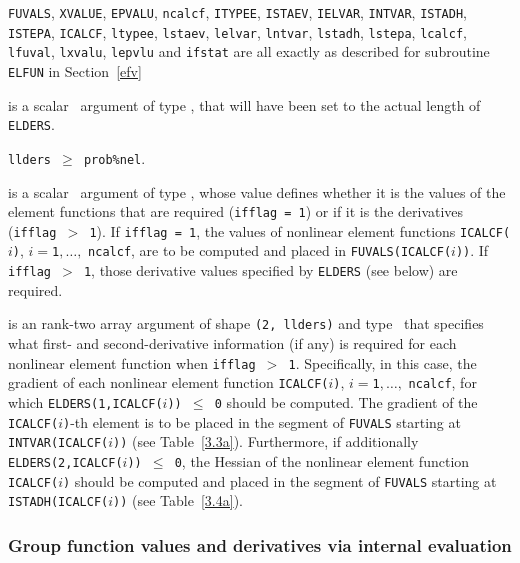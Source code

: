\documentclass{galahad}
\begin{document}
\begin{description}

{\tt FUVALS}, {\tt XVALUE}, {\tt EPVALU}, {\tt ncalcf}, {\tt ITYPEE},
{\tt ISTAEV}, {\tt IELVAR},
{\tt INTVAR}, {\tt ISTADH}, {\tt ISTEPA}, {\tt ICALCF}, {\tt ltypee},
{\tt lstaev}, {\tt lelvar},
{\tt lntvar}, {\tt lstadh}, {\tt lstepa}, {\tt lcalcf}, {\tt lfuval},
{\tt lxvalu}, {\tt lepvlu} and
{\tt ifstat} are all exactly as described for subroutine {\tt ELFUN}
in Section~\ref{efv}

 is a scalar \intentin\ argument of type \integer, that
will have been set to the actual length of {\tt ELDERS}.

\restriction
{\tt llders $\geq$ prob\%nel}.

 is a scalar \intentin\ argument of type \integer,
whose value defines whether it is the values of the element functions
that are required ({\tt ifflag = 1}) or if it is the derivatives
({\tt ifflag $>$ 1}). If
{\tt ifflag = 1}, the values of nonlinear element functions
{\tt ICALCF($i$)}, $i = ${\tt 1}$, \ldots ,$ {\tt ncalcf}, are to be computed
and placed in {\tt FUVALS(ICALCF($i$))}. If {\tt ifflag $>$ 1}, those
derivative values specified by {\tt ELDERS} (see below) are required.


is an rank-two \intentinout array argument of
shape {\tt (2, llders)} and type \integer\,
that specifies what first- and second-derivative information (if any) is
required for each nonlinear element function when {\tt ifflag $>$ 1}.
Specifically, in this case, the gradient of each nonlinear element function
{\tt ICALCF($i$)}, $i = ${\tt 1}$, \ldots ,$ {\tt ncalcf},
for which {\tt ELDERS(1,ICALCF($i$)) $\leq$ 0} should be computed.
The gradient of the {\tt ICALCF($i$)}-th element is to be placed in
the segment of {\tt FUVALS} starting at {\tt INTVAR(ICALCF($i$))}
(see Table~\ref{3.3a}). Furthermore, if additionally
{\tt ELDERS(2,ICALCF($i$)) $\leq$ 0}, the Hessian of the
nonlinear element function {\tt ICALCF($i$)} should be computed and placed in
the segment of {\tt FUVALS} starting at {\tt ISTADH(ICALCF($i$))}
(see Table~\ref{3.4a}).

\end{description}


\subsubsection{Group function values and derivatives via internal
evaluation\label{gfv}}
\end{document}
